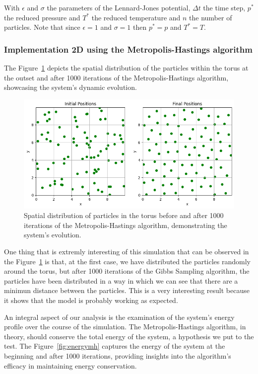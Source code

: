 \documentclass{report}
\begin{document}
With \( \epsilon \) and \( \sigma \) the parameters of the Lennard-Jones potential, \( \Delta t \) the time step, \( p^{*} \) the reduced pressure and \( T^{*} \) the reduced temperature and \(n\) the number of particles. Note that since \(\epsilon = 1 \) and \( \sigma = 1\) then \(p^{*} = p\) and \(T^{*} = T\).

\subsubsection{Implementation 2D using the Metropolis-Hastings algorithm}
\label{sec:lennard_jones_2d}

The Figure~\ref{fig:particlesmh} depicts the spatial distribution of the particles within the torus at the outset and after 1000 iterations of the Metropolis-Hastings algorithm, showcasing the system's dynamic evolution.

\begin{figure}[H]
	\centering
	\includegraphics[width=0.75\linewidth]{./Figures/MCMC/LennardJones/particles.png}
	\caption{Spatial distribution of particles in the torus before and after 1000 iterations of the Metropolis-Hastings algorithm, demonstrating the system's evolution.}
	\label{fig:particlesmh}
\end{figure}

One thing that is extremly interesting of this simulation that can be observed in the Figure~\ref{fig:particlesmh} is that, at the first case, we have distributed the particles randomly around the torus, but after 1000 iterations of the Gibbs Sampling algorithm, the particles have been distributed in a way in which we can see that there are a minimun distance between the particles. This is a very interesting result because it shows that the model is probably working as expected.

An integral aspect of our analysis is the examination of the system's energy profile over the course of the simulation. The Metropolis-Hastings algorithm, in theory, should conserve the total energy of the system, a hypothesis we put to the test. The Figure~\ref{fig:energymh} captures the energy of the system at the beginning and after 1000 iterations, providing insights into the algorithm's efficacy in maintaining energy conservation.
\end{document}
